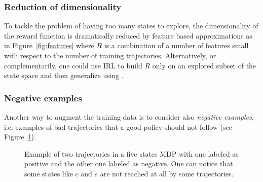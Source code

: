 \documentclass{article}
\begin{document}
\subsubsection{Reduction of dimensionality}
To tackle the problem of having too many states to explore, the dimensionality of the reward function is dramatically reduced by feature based approximations \cite{Abbeel04, Levine11} as in Figure~\ref{fig:features} where $R$ is a combination of a number of features small with respect to the number of training trajectories. Alternatively, or complementarily, one could use IRL to build $R$ only on an explored subset of the state space and then generalize using \cite{Finn17}.

\subsubsection{Negative examples}
Another way to augment the training data is to consider also \emph{negative examples}, i.e. examples of bad trajectories that a good policy should not follow (see Figure~\ref{fig:negpos}).


\begin{figure}
\begin{center}
\end{center}
\caption{Example of two trajectories in a five states MDP with one labeled as positive and the other one labeled as negative. One can notice that some states like $c$ and $e$ are not reached at all by some trajectories. \label{fig:negpos}}
\end{figure}
\end{document}
